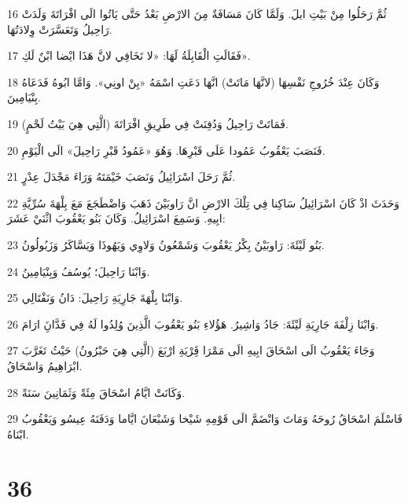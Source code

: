 \par 16 ثُمَّ رَحَلُوا مِنْ بَيْتِ ايلَ. وَلَمَّا كَانَ مَسَافَةٌ مِنَ الارْضِ بَعْدُ حَتَّى يَاتُوا الَى افْرَاتَةَ وَلَدَتْ رَاحِيلُ وَتَعَسَّرَتْ وِلادَتُهَا.
\par 17 فَقَالَتِ الْقَابِلَةُ لَهَا: «لا تَخَافِي لانَّ هَذَا ايْضا ابْنٌ لَكِ».
\par 18 وَكَانَ عِنْدَ خُرُوجِ نَفْسِهَا (لانَّهَا مَاتَتْ) انَّهَا دَعَتِ اسْمَهُ «بِنْ اونِي». وَامَّا ابُوهُ فَدَعَاهُ بِنْيَامِينَ.
\par 19 فَمَاتَتْ رَاحِيلُ وَدُفِنَتْ فِي طَرِيقِ افْرَاتَةَ (الَّتِي هِيَ بَيْتُ لَحْمٍ).
\par 20 فَنَصَبَ يَعْقُوبُ عَمُودا عَلَى قَبْرِهَا. وَهُوَ «عَمُودُ قَبْرِ رَاحِيلَ» الَى الْيَوْمِ.
\par 21 ثُمَّ رَحَلَ اسْرَائِيلُ وَنَصَبَ خَيْمَتَهُ وَرَاءَ مَجْدَلَ عِدْرٍ.
\par 22 وَحَدَثَ اذْ كَانَ اسْرَائِيلُ سَاكِنا فِي تِلْكَ الارْضِ انَّ رَاوبَيْنَ ذَهَبَ وَاضْطَجَعَ مَعَ بِلْهَةَ سُرِّيَّةِ ابِيهِ. وَسَمِعَ اسْرَائِيلُ. وَكَانَ بَنُو يَعْقُوبَ اثْنَيْ عَشَرَ:
\par 23 بَنُو لَيْئَةَ: رَاوبَيْنُ بِكْرُ يَعْقُوبَ وَشَمْعُونُ وَلاوِي وَيَهُوذَا وَيَسَّاكَرُ وَزَبُولُونُ.
\par 24 وَابْنَا رَاحِيلَ؛ يُوسُفُ وَبِنْيَامِينُ.
\par 25 وَابْنَا بِلْهَةَ جَارِيَةِ رَاحِيلَ: دَانُ وَنَفْتَالِي.
\par 26 وَابْنَا زِلْفَةَ جَارِيَةِ لَيْئَةَ: جَادُ وَاشِيرُ. هَؤُلاءِ بَنُو يَعْقُوبَ الَّذِينَ وُلِدُوا لَهُ فِي فَدَّانَِ ارَامَ.
\par 27 وَجَاءَ يَعْقُوبُ الَى اسْحَاقَ ابِيهِ الَى مَمْرَا قَِرْيَةِ ارْبَعَ (الَّتِي هِيَ حَبْرُونُ) حَيْثُ تَغَرَّبَ ابْرَاهِيمُ وَاسْحَاقُ.
\par 28 وَكَانَتْ ايَّامُ اسْحَاقَ مِئَةً وَثَمَانِينَ سَنَةً.
\par 29 فَاسْلَمَ اسْحَاقُ رُوحَهُ وَمَاتَ وَانْضَمَّ الَى قَوْمِهِ شَيْخا وَشَبْعَانَ ايَّاما وَدَفَنَهُ عِيسُو وَيَعْقُوبُ ابْنَاهُ.

\chapter{36}

